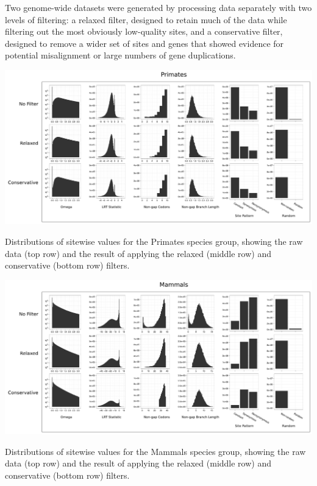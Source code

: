 Two genome-wide datasets were generated by processing \sw data
separately with two levels of filtering: a relaxed filter, designed to
retain much of the data while filtering out the most obviously
low-quality sites, and a conservative filter, designed to remove a
wider set of sites and genes that showed evidence for potential
misalignment or large numbers of gene duplications.

\bbfig
\centering
\includegraphics[scale=0.42]{Figs/qc_hist_primates.pdf}
\caption{Distributions of sitewise values for the Primates species
  group, showing the raw data (top row) and the result of applying the
  relaxed (middle row) and conservative (bottom row) filters.}
\label{fig_qc_hist_primates}
\eefig

\bbfig
\centering
\includegraphics[scale=0.42]{Figs/qc_hist_mammals.pdf}
\caption{Distributions of sitewise values for the Mammals species
  group, showing the raw data (top row) and the result of applying the
  relaxed (middle row) and conservative (bottom row) filters.}
\label{fig_qc_hist_mammals}
\eefig
 
